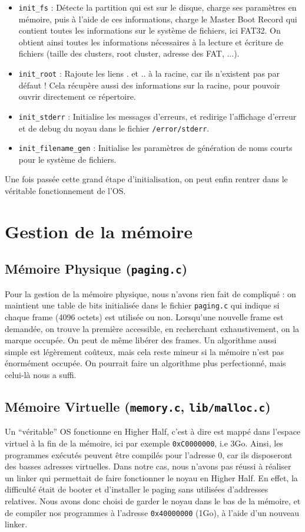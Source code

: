 \documentclass[a4paper,10pt, french]{article}
\newcommand{\code}[1]{\texttt{#1}}
\begin{document}
\begin{itemize}
 \item \code{init\_fs} : Détecte la partition qui est sur le disque, charge ses paramètres en mémoire,
 puis à l'aide de ces informations, charge le Master Boot Record qui contient toutes les informations sur
 le système de fichiers, ici FAT32. On obtient ainsi toutes les informations nécessaires à la lecture et écriture de 
 fichiers (taille des clusters, root cluster, adresse des FAT, ...).
 \item \code{init\_root} : Rajoute les liens . et .. à la racine, car ils n'existent pas par défaut !
 Cela récupère aussi des informations sur la racine, pour pouvoir ouvrir directement ce répertoire.
 \item \code{init\_stderr} : Initialise les messages d'erreurs, et redirige l'affichage d'erreur et de debug du noyau dans 
 le fichier \code{/error/stderr}.
 \item \code{init\_filename\_gen} : Initialise les paramètres de génération de noms courts pour le système de fichiers.
\end{itemize}

Une fois passée cette grand étape d'initialisation, on peut enfin rentrer dans le véritable fonctionnement de l'OS.

\section{Gestion de la mémoire}
\subsection{Mémoire Physique (\code{paging.c})}
Pour la gestion de la mémoire physique, nous n'avons rien fait de compliqué : on maintient une table de bits 
initialisée dans le fichier \code{paging.c} qui indique si chaque frame (4096 octets) est utilisée ou non.
Lorsqu'une nouvelle frame est demandée, on trouve la première accessible, en recherchant exhaustivement, on la marque occupée.
On peut de même libérer des frames.
Un algorithme aussi simple est légèrement coûteux, mais cela reste mineur si la mémoire n'est pas énormément occupée.
On pourrait faire un algorithme plus perfectionné, mais celui-là nous a suffi.

\subsection{Mémoire Virtuelle (\code{memory.c}, \code{lib/malloc.c})}
Un ``véritable'' OS fonctionne en Higher Half, c'est à dire est mappé dans l'espace virtuel à la fin de la mémoire,
ici par exemple \code{0xC0000000}, i.e 3Go. Ainsi, les programmes exécutés peuvent être compilés pour l'adresse 
0, car ils disposeront des basses adresses virtuelles. Dans notre cas, nous n'avons pas réussi à réaliser un linker
qui permettait de faire fonctionner le noyau en Higher Half. En effet, la difficulté était de booter et d'installer le paging
sans utilisées d'addresses relatives. Nous avons donc choisi de garder le noyau dans le bas de la mémoire,
et de compiler nos programmes à l'adresse \code{0x40000000} (1Go), à l'aide d'un nouveau linker.
\end{document}
